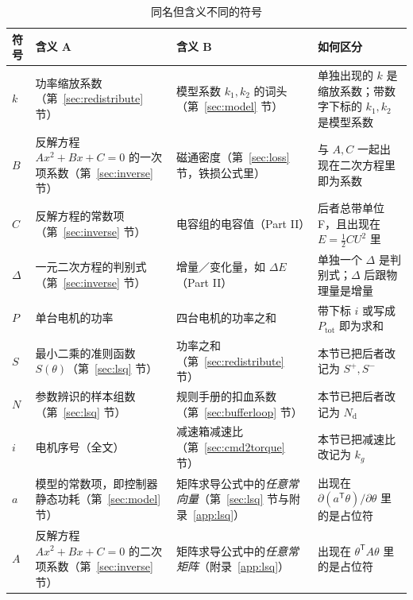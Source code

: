 \documentclass[cn,blue,11pt,device=normal]{elegantnote}
\begin{document}
\begin{table}[htbp]
  \centering
  \small
  \caption{同名但含义不同的符号}
  \label{tab:sym-clash}
  \begin{tabular}{@{}>{\raggedright\arraybackslash}p{}>{\raggedright\arraybackslash}p{}>{\raggedright\arraybackslash}p{}>{\raggedright\arraybackslash}p{}@{}}
    \toprule
    符号 & 含义 A & 含义 B & 如何区分 \\
    \midrule
    $k$      & 功率缩放系数（第~\ref{sec:redistribute} 节） & 模型系数 $k_1,k_2$ 的词头（第~\ref{sec:model} 节） & 单独出现的 $k$ 是缩放系数；带数字下标的 $k_1,k_2$ 是模型系数 \\[3pt]
    $B$      & 反解方程 $Ax^{2}+Bx+C=0$ 的一次项系数（第~\ref{sec:inverse} 节） & 磁通密度（第~\ref{sec:loss} 节，铁损公式里） & 与 $A,C$ 一起出现在二次方程里即为系数 \\[3pt]
    $C$      & 反解方程的常数项（第~\ref{sec:inverse} 节） & 电容组的电容值（Part II） & 后者总带单位 F，且出现在 $E=\frac12CU^{2}$ 里 \\[3pt]
    $\Delta$ & 一元二次方程的判别式（第~\ref{sec:inverse} 节） & 增量／变化量，如 $\Delta E$（Part II） & 单独一个 $\Delta$ 是判别式；$\Delta$ 后跟物理量是增量 \\[3pt]
    $P$      & 单台电机的功率 & 四台电机的功率之和 & 带下标 $i$ 或写成 $P_{\mathrm{tot}}$ 即为求和 \\[3pt]
    $S$      & 最小二乘的准则函数 $S(\theta)$（第~\ref{sec:lsq} 节） & 功率之和（第~\ref{sec:redistribute} 节） & 本节已把后者改记为 $S^{+},S^{-}$ \\[3pt]
    $N$      & 参数辨识的样本组数（第~\ref{sec:lsq} 节） & 规则手册的扣血系数（第~\ref{sec:bufferloop} 节） & 本节已把后者改记为 $N_{\mathrm{d}}$ \\[3pt]
    $i$      & 电机序号（全文） & 减速箱减速比（第~\ref{sec:cmd2torque} 节） & 本节已把减速比改记为 $k_g$ \\[3pt]
    $a$      & 模型的常数项，即控制器静态功耗（第~\ref{sec:model} 节） & 矩阵求导公式中的\emph{任意常向量}（第~\ref{sec:lsq} 节与附录~\ref{app:lsq}） & 出现在 $\partial(a^{\mathsf T}\theta)/\partial\theta$ 里的是占位符 \\[3pt]
    $A$      & 反解方程 $Ax^{2}+Bx+C=0$ 的二次项系数（第~\ref{sec:inverse} 节） & 矩阵求导公式中的\emph{任意常矩阵}（附录~\ref{app:lsq}） & 出现在 $\theta^{\mathsf T}A\theta$ 里的是占位符 \\
    \bottomrule
  \end{tabular}
\end{table}
\end{document}
